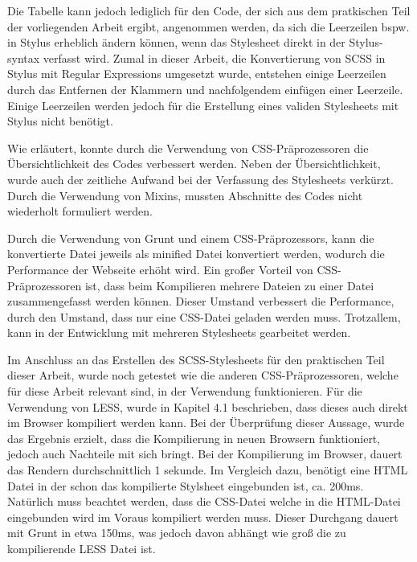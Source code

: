 Die Tabelle kann jedoch lediglich für den Code, der sich aus dem pratkischen Teil der vorliegenden Arbeit ergibt, angenommen werden, da sich die Leerzeilen bspw. in Stylus erheblich ändern können, wenn das Stylesheet direkt in der Stylus-syntax verfasst wird.\newline
Zumal in dieser Arbeit, die Konvertierung von SCSS in Stylus mit Regular Expressions umgesetzt wurde, entstehen einige Leerzeilen durch das Entfernen der Klammern und nachfolgendem einfügen einer Leerzeile.\newline
Einige Leerzeilen werden jedoch für die Erstellung eines validen Stylesheets mit Stylus nicht benötigt.

Wie erläutert, konnte durch die Verwendung von CSS-Präprozessoren die Übersichtlichkeit des Codes verbessert werden. Neben der Übersichtlichkeit, wurde auch der zeitliche Aufwand bei der Verfassung des Stylesheets verkürzt. Durch die Verwendung von Mixins, mussten Abschnitte des Codes nicht wiederholt formuliert werden. \newline

Durch die Verwendung von Grunt und einem CSS-Präprozessors, kann die konvertierte Datei jeweils als minified Datei konvertiert werden, wodurch die Performance der Webseite erhöht wird. Ein großer Vorteil von CSS-Präprozessoren ist, dass beim Kompilieren mehrere Dateien zu einer Datei zusammengefasst werden können. Dieser Umstand verbessert die Performance, durch den Umstand, dass nur eine CSS-Datei geladen werden muss. Trotzallem, kann in der Entwicklung mit mehreren Stylesheets gearbeitet werden.

Im Anschluss an das Erstellen des SCSS-Stylesheets für den praktischen Teil dieser Arbeit, wurde noch getestet wie die anderen CSS-Präprozessoren, welche für diese Arbeit relevant sind, in der Verwendung funktionieren.\newline
Für die Verwendung von LESS, wurde in Kapitel 4.1 beschrieben, dass dieses auch direkt im Browser kompiliert werden kann. Bei der Überprüfung dieser Aussage, wurde das Ergebnis erzielt, dass die Kompilierung in neuen Browsern funktioniert, jedoch auch Nachteile mit sich bringt.\newline
Bei der Kompilierung im Browser, dauert das Rendern durchschnittlich 1 sekunde. Im Vergleich dazu, benötigt eine HTML Datei in der schon das kompilierte Stylsheet eingebunden ist, ca. 200ms. \newline
Natürlich muss beachtet werden, dass die CSS-Datei welche in die HTML-Datei eingebunden wird im Voraus kompiliert werden muss. Dieser Durchgang dauert mit Grunt in etwa 150ms, was jedoch davon abhängt wie groß die zu kompilierende LESS Datei ist.

